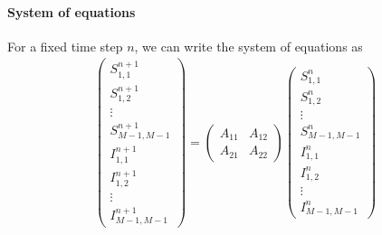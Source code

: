 \paragraph{System of equations}

For a fixed time step \(n\), we can write the system of equations as
\begin{align*}
  \begin{pmatrix}
    S_{1,1}^{n+1}     \\
    S_{1,2}^{n+1}     \\
    \vdots            \\
    S_{M-1,M-1}^{n+1} \\
    I_{1,1}^{n+1}     \\
    I_{1,2}^{n+1}     \\
    \vdots            \\
    I_{M-1,M-1}^{n+1}
  \end{pmatrix}
  =
  \begin{pmatrix}
    A_{11} & A_{12} \\
    A_{21} & A_{22}
  \end{pmatrix}
  \begin{pmatrix}
    S_{1,1}^n     \\
    S_{1,2}^n     \\
    \vdots        \\
    S_{M-1,M-1}^n \\
    I_{1,1}^n     \\
    I_{1,2}^n     \\
    \vdots        \\
    I_{M-1,M-1}^n
  \end{pmatrix}
\end{align*}


